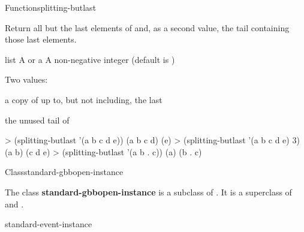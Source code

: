 \documentclass[10pt,twoside,english,pdftex]{article}
\begin{document}
\begin{functiondoc}{Function}{splitting-butlast}{
      
    \mbox{\returns{} }}
%
%
  
\fnsyntax

\fnpurpose Return all but the last  elements of 
and, as a second value, the tail containing those last 
elements. 

\fnpackage {}

\fnmodule {}

\fnargs
\begin{args}{list}
\arg[list] A  or a 
\arg[n] A non-negative integer (default is )
\end{args}

\fnreturns Two values:
\begin{tightitemize}
\item a copy of  up to, but not including, the last
   
\item the unused tail of 
\end{tightitemize}

\fnexamples
%
\W\supp
\begin{example}
> (splitting-butlast '(a b c d e))
(a b c d)
(e)
> (splitting-butlast '(a b c d e) 3)
(a b)
(c d e)\goodpagebreak
> (splitting-butlast '(a b . c))
(a)
(b . c)
\end{example}

\end{functiondoc}


\begin{functiondoc}{Class}{standard-gbbopen-instance}{}
%
  
\fnsyntax

\fnpackage {}

\fnmodule {}

\fndescription The class \textbf{standard-gbbopen-instance} is a subclass of
.  It is a superclass of
\textbf{} and
\textbf{}.

\begin{alsos}{standard-event-instance}
\end{alsos}

\end{functiondoc}
\end{document}
